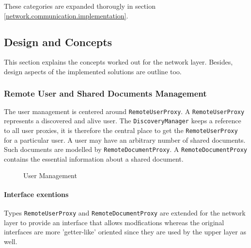 These categories are expanded thorougly in section \ref{network.communication.implementation}.

\subsection{Design and Concepts}
This section explains the concepts worked out for the network layer. Besides, design aspects of the implemented solutions are outline too.

\subsubsection{Remote User and Shared Documents Management}
The user management is centered around \texttt{RemoteUserProxy}. A  \texttt{Remote\-User\-Proxy} represents a discovered and alive user. The  \texttt{DiscoveryManager} keeps a reference to all user proxies, it is therefore the central place to get the  \texttt{RemoteUserProxy} for a particular user. A user may have an arbitrary number of shared documents. Such documents are modelled by  \texttt{RemoteDocumentProxy}. A  \texttt{RemoteDocumentProxy} contains the essential information about a shared document.

\begin{figure}[H]
 \centering
 \caption{User Management}
 \label{fig:network.discovery.usermanagement}
\end{figure}

\paragraph{Interface exentions}
Types  \texttt{RemoteUserProxy}  and  \texttt{RemoteDocumentProxy} are extended for the network layer to provide an interface that allows modfications whereas the original interfaces are more 'getter-like' oriented since they are used by the upper layer as well.

